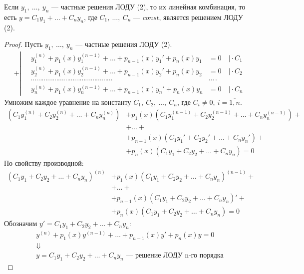 \newpage
\begin{theorem*}
    Если $y_1,\ \ldots,\ y_n$ --- частные решения ЛОДУ (2), то их линейная комбинация, то есть $y = C_1y_1 + \ldots + C_ny_n$, где $C_1,\ \ldots,\ C_n$ --- $const$, является решением ЛОДУ (2).
\end{theorem*}
\begin{proof}
    Пусть $y_1,\ \ldots,\ y_n$ --- частные решения ЛОДУ (2).
    \begin{align*}
        + \left|\quad\begin{aligned}
            y_1^{(n)} + p_1(x)y_1^{(n-1)} + \ldots + p_{n-1}(x)y_1' + p_n(x)y_1 &= 0\quad \Big| \cdot C_1 \\ 
            y_2^{(n)} + p_1(x)y_2^{(n-1)} + \ldots + p_{n-1}(x)y_2' + p_n(x)y_2 &= 0\quad \Big| \cdot C_2 \\
            \cdots\cdots\cdots\cdots\cdots\cdots\cdots\cdots\cdots\cdots\cdots\cdots\cdots\cdots\cdots&\cdots\cdot \\
            y_n^{(n)} + p_1(x)y_n^{(n-1)} + \ldots + p_{n-1}(x)y_n' + p_n(x)y_n &= 0\quad \Big| \cdot C_n
        \end{aligned}\right.
    \end{align*}
    Умножим каждое уравнение на константу $C_1,\ C_2,\ \ldots,\ C_n$, где $C_i \ne 0,\ i = \overline{1,n}$.
    \begin{align*}
        \left(C_1y_1^{(n)} + C_2y_2^{(n)} + \ldots + C_ny_n^{(n)}\right) &+ p_1(x)\left(C_1y_1^{(n-1)} + C_2y_2^{(n-1)} + \ldots + C_ny_n^{(n-1)}\right) + \\ 
        &+ \ldots + \\ 
        &+ p_{n-1}(x) \left(C_1y_1' + C_2y_2' + \ldots + C_ny_n'\right) + \\ 
        &+ p_{n}(x) \left(C_1y_1 + C_2y_2 + \ldots + C_ny_n\right) = 0
    \end{align*}
    По свойству производной:
    \begin{align*}
        \left(C_1y_1 + C_2y_2 + \ldots + C_ny_n\right)^{(n)} &+ p_1(x)\left(C_1y_1 + C_2y_2 + \ldots + C_ny_n\right)^{(n-1)} + \\ 
        &+ \ldots + \\ 
        &+ p_{n-1}(x) \left(C_1y_1 + C_2y_2 + \ldots + C_ny_n\right)' + \\ 
        &+ p_{n}(x) \left(C_1y_1 + C_2y_2 + \ldots + C_ny_n\right) = 0
    \end{align*}
    Обозначим $y' = C_1y_1 + C_2y_2 + \ldots + C_ny_n$:
    \begin{gather*}
        y^{(n)} + p_1(x) y^{(n-1)} + \ldots + p_{n-1} (x)y' + p_n(x) y = 0 \\
        \Downarrow \\
        y = C_1y_1 + C_2y_2 + \ldots + C_ny_n \text{ --- решение ЛОДУ n-го порядка}
    \end{gather*}
\end{proof}

